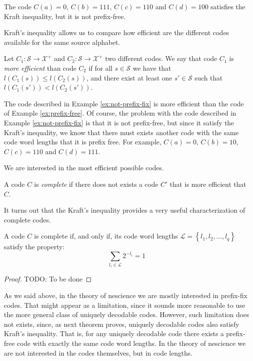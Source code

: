 \begin{example}
\label{ex:not-prefix-fix}
The code $C(a)=0$, $C(b)=111$, $C(c)=110$ and $C(d)=100$ satisfies the Kraft inequality, but it is not prefix-free.
\end{example}

Kraft's inequality allows us to compare how efficient are the different codes available for the same source alphabet.

\begin{definition}
Let $C_1:\mathcal{S}\rightarrow\mathcal{X}^{+}$ and $C_2:\mathcal{S}\rightarrow\mathcal{X}^{+}$ two different codes. We say that code $C_1$ is \emph{more efficient} than code $C_2$ if for all $s \in \mathcal{S}$ we have that $l(C_1(s)) \leq l(C_2(s))$, and there exist at least one $s' \in \mathcal{S}$ such that $l(C_1(s')) < l(C_2(s'))$.
\end{definition}

\begin{example}
The code described in Example \ref{ex:not-prefix-fix} is more efficient than the code of Example \ref{ex:prefix-free}. Of course, the problem with the code described in Example \ref{ex:not-prefix-fix} is that it is not prefix-free, but since it satisfy the Kraft's inequality, we know that there must exists another code with the same code word lengths that it is prefix free. For example, $C(a)=0$, $C(b)=10$, $C(c)=110$ and $C(d)=111$.
\end{example}

We are interested in the most efficient possible codes.

\begin{definition}
A code $C$ is \emph{complete} if there does not exists a code $C'$ that is more efficient that $C$.
\end{definition}

It turns out that the Kraft's inequality provides a very useful characterization of complete codes.

\begin{proposition}
A code $C$ is complete if, and only if, its code word lengths $\mathcal{L}=\left\{ l_{1},l_{2},\ldots,l_{q}\right\}$ satisfy the property:
\[
\sum_{l_{i}\in\mathcal{L}}2^{-l_{i}} = 1
\]
\end{proposition}
\begin{proof}
{\color{red} TODO: To be done}
\end{proof}

As we said above, in the theory of nescience we are mostly interested in prefix-fix codes. That might appear as a limitation, since it sounds more reasonable to use the more general class of uniquely decodable codes. However, such limitation does not exists, since, as next theorem proves, uniquely decodable codes also satisfy Kraft's inequality. That is, for any uniquely decodable code there exists a prefix-free code with exactly the same code word lengths. In the theory of nescience we are not interested in the codes themselves, but in code lengths.

